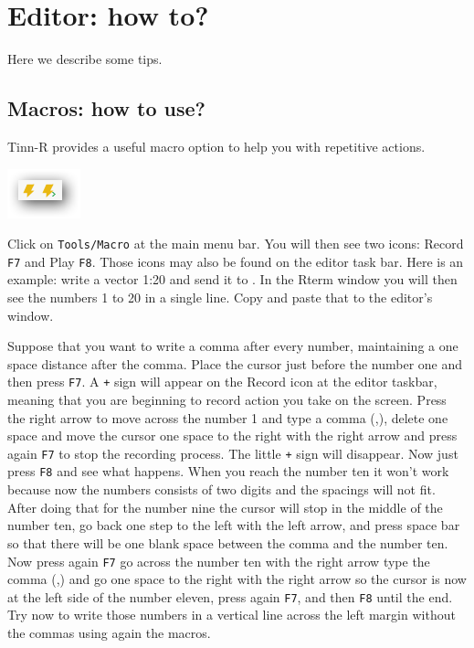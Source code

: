 
\section{Editor: how to?}

Here we describe some tips.

\subsection{Macros: how to use?}

Tinn-R provides a useful macro option to help you with repetitive actions.

\includegraphics[scale=0.50]{./res/secrets_macro.png}

Click on \texttt{Tools/Macro} at the main menu bar. You will then see two icons: Record \texttt{F7} and Play \texttt{F8}.
Those icons may also be found on the editor task bar. Here is an example: write a vector 1:20 and send it to \RR{}.
In the Rterm window you will then see the numbers 1 to 20 in a single line. Copy and paste that to the editor's window.

Suppose that you want to write a comma after every number, maintaining a one space distance after the comma.
Place the cursor just before the number one and then press \texttt{F7}.
A \texttt{+} sign will appear on the Record icon at the editor taskbar, meaning that you are beginning to record action
you take on the screen. Press the right arrow to move across the number 1 and type a comma (,),
delete one space and move the cursor one space to the right with the right arrow and press again
\texttt{F7} to stop the recording process. The little \texttt{+} sign will disappear.
Now just press \texttt{F8} and see what happens. When you reach the number ten it won't work because now the numbers
consists of two digits and the spacings will not fit.
After doing that for the number nine the cursor will stop in the middle of the number ten,
go back one step to the left with the left arrow, and press space bar so that there will be one blank space
between the comma and the number ten. Now press again \texttt{F7} go across the number ten with the right arrow
type the comma (,) and go one space to the right with the right arrow so the cursor is now at the left side of
the number eleven, press again \texttt{F7}, and then \texttt{F8} until the end.
Try now to write those numbers in a vertical line across the left margin without the commas using again the macros.

